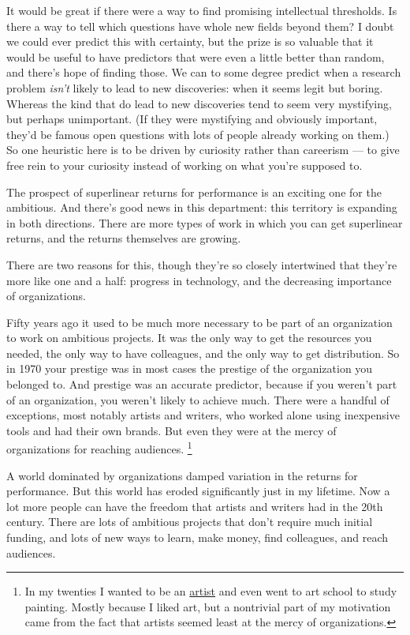 \documentclass[12pt]{book}
\begin{document}
It would be great if there were a way to find promising intellectual
thresholds. Is there a way to tell which questions have whole new fields
beyond them? I doubt we could ever predict this with certainty, but the
prize is so valuable that it would be useful to have predictors that
were even a little better than random, and there's hope of finding
those. We can to some degree predict when a research problem
\emph{isn't} likely to lead to new discoveries: when it seems legit but
boring. Whereas the kind that do lead to new discoveries tend to seem
very mystifying, but perhaps unimportant. (If they were mystifying and
obviously important, they'd be famous open questions with lots of people
already working on them.) So one heuristic here is to be driven by
curiosity rather than careerism --- to give free rein to your curiosity
instead of working on what you're supposed to.

The prospect of superlinear returns for performance is an exciting one
for the ambitious. And there's good news in this department: this
territory is expanding in both directions. There are more types of work
in which you can get superlinear returns, and the returns themselves are
growing.

There are two reasons for this, though they're so closely intertwined
that they're more like one and a half: progress in technology, and the
decreasing importance of organizations.

Fifty years ago it used to be much more necessary to be part of an
organization to work on ambitious projects. It was the only way to get
the resources you needed, the only way to have colleagues, and the only
way to get distribution. So in 1970 your prestige was in most cases the
prestige of the organization you belonged to. And prestige was an
accurate predictor, because if you weren't part of an organization, you
weren't likely to achieve much. There were a handful of exceptions, most
notably artists and writers, who worked alone using inexpensive tools
and had their own brands. But even they were at the mercy of
organizations for reaching audiences. \footnote{In my twenties I wanted to be an \href{worked.html}{artist} and
even went to art school to study painting. Mostly because I liked art,
but a nontrivial part of my motivation came from the fact that artists
seemed least at the mercy of organizations.}

A world dominated by organizations damped variation in the returns for
performance. But this world has eroded significantly just in my
lifetime. Now a lot more people can have the freedom that artists and
writers had in the 20th century. There are lots of ambitious projects
that don't require much initial funding, and lots of new ways to learn,
make money, find colleagues, and reach audiences.
\end{document}
